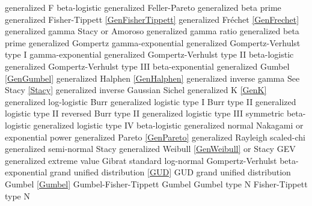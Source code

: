 generalized F					\dotfill	beta-logistic 						\ncite	%
generalized Feller-Pareto			\dotfill	generalized beta prime				
generalized Fisher-Tippett			\dotfill	\eqref{GenFisherTippett} 				\ncite	%
generalized Fr\'{e}chet 			\dotfill	\eqref{GenFrechet} 					\ncite	%
generalized gamma 				\dotfill	Stacy or Amoroso 					\ncite	%
generalized gamma ratio			\dotfill	generalized beta prime				 	%
generalized Gompertz			\dotfill	gamma-exponential					
generalized Gompertz-Verhulst type I \dotfill	gamma-exponential					    	%
generalized Gompertz-Verhulst type II \dotfill	beta-logistic  						    	%
generalized Gompertz-Verhulst type III \dotfill	beta-exponential 					   		%
generalized Gumbel				\dotfill	\eqref{GenGumbel}					\ncite	%
generalized Halphen				\dotfill	\eqref{GenHalphen}					\ncite
generalized inverse gamma 		\dotfill	See Stacy \eqref{Stacy} 				\ncite	%
generalized inverse Gaussian		\dotfill	Sichel							\ncite
generalized K					\dotfill	\eqref{GenK}						\mcite{\self} 
generalized log-logistic			\dotfill	Burr 								\ncite	%
generalized logistic type I			\dotfill	Burr type II 						\ncite	%
generalized logistic type II			\dotfill	reversed Burr type II 					\ncite	%
generalized logistic type III		\dotfill	symmetric beta-logistic  				\ncite	%
generalized logistic type IV		\dotfill	beta-logistic 						   		%
generalized normal	 			\dotfill	Nakagami or exponential power		\ncite	%
generalized Pareto				\dotfill	\eqref{GenPareto}					\ncite	%
generalized Rayleigh	 			\dotfill	scaled-chi							\ncite	%
generalized semi-normal			\dotfill	Stacy 							   	%
generalized Weibull				\dotfill	\eqref{GenWeibull} or Stacy			\ncite	%
GEV 						\dotfill	generalized extreme value 			\ncite	%
Gibrat						\dotfill	standard log-normal 					\ncite 	%
Gompertz-Verhulst				\dotfill	beta-exponential 					    	%
grand unified distribution			\dotfill	\eqref{GUD}						\mcite{\self}	%
GUD							\dotfill	grand unified distribution				\mcite{\self}	%
Gumbel 						\dotfill	\eqref{Gumbel} 						\ncite	%
Gumbel-Fisher-Tippett			\dotfill	Gumbel 							\ncite 	%
Gumbel type N 					\dotfill	Fisher-Tippett type N 				\ncite	%
